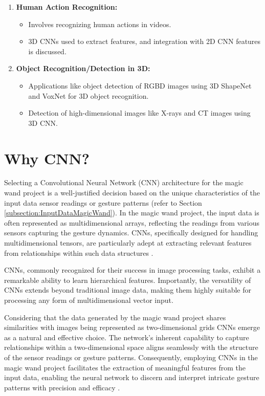 \begin{enumerate}
	\item \textbf{Human Action Recognition:}  \cite{Mard:2017}
	\begin{itemize}
		\item Involves recognizing human actions in videos.
		\item 3D CNNs used to extract features, and integration with 2D CNN features is discussed.
	\end{itemize}
	
	\item \textbf{Object Recognition/Detection in 3D:}
	\begin{itemize}
		\item Applications like object detection of RGBD images using 3D ShapeNet and VoxNet for 3D object recognition.
		\item Detection of high-dimensional images like X-rays and CT images using 3D CNN.
	\end{itemize}
\end{enumerate}


\section{Why CNN?}

Selecting a Convolutional Neural Network (CNN) architecture for the magic wand project is a well-justified decision based on the unique characteristics of the input data sensor readings or gesture patterns (refer to Section \ref{subsection:InputDataMagicWand}). In the magic wand project, the input data is often represented as multidimensional arrays, reflecting the readings from various sensors capturing the gesture dynamics. CNNs, specifically designed for handling multidimensional tensors, are particularly adept at extracting relevant features from relationships within such data structures \cite{War:2020}.

CNNs, commonly recognized for their success in image processing tasks, exhibit a remarkable ability to learn hierarchical features. Importantly, the versatility of CNNs extends beyond traditional image data, making them highly suitable for processing any form of multidimensional vector input.

Considering that the data generated by the magic wand project shares similarities with images being represented as two-dimensional grids CNNs emerge as a natural and effective choice. The network's inherent capability to capture relationships within a two-dimensional space aligns seamlessly with the structure of the sensor readings or gesture patterns. Consequently, employing CNNs in the magic wand project facilitates the extraction of meaningful features from the input data, enabling the neural network to discern and interpret intricate gesture patterns with precision and efficacy \cite{Xu:2022}.

